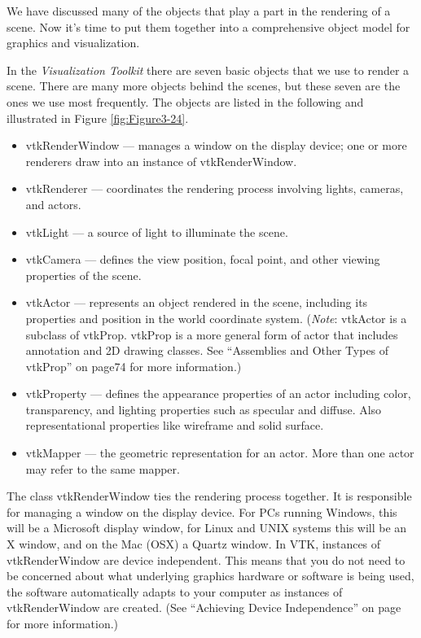 We have discussed many of the objects that play a part in the rendering of a scene. Now it's time to put them together into a comprehensive object model for graphics and visualization.

In the \emph{Visualization Toolkit} there are seven basic objects that we use to render a scene. There are many more objects behind the scenes, but these seven are the ones we use most frequently. The objects are listed in the following and illustrated in Figure \ref{fig:Figure3-24}.

\begin{itemize}
\item vtkRenderWindow --- manages a window on the display device; one or   more renderers draw into an instance of vtkRenderWindow.

\item vtkRenderer --- coordinates the rendering process involving lights,   cameras, and actors.

\item vtkLight --- a source of light to illuminate the scene. 

\item vtkCamera --- defines the view position, focal point, and other viewing properties of the scene.

\item vtkActor --- represents an object rendered in the scene, including its properties and position in the world coordinate system. (\emph{Note}: vtkActor is a subclass of vtkProp. vtkProp is a more general form of actor that includes annotation and 2D drawing classes. See ``Assemblies and Other Types of vtkProp'' on page74 for more
information.)

\item vtkProperty --- defines the appearance properties of an actor including color, transparency, and lighting properties such as specular and diffuse. Also representational properties like wireframe and solid surface.

\item vtkMapper --- the geometric representation for an actor. More than one actor may refer to the same mapper.
\end{itemize}

The class vtkRenderWindow ties the rendering process together. It is responsible for managing a window on the display device. For PCs running Windows, this will be a Microsoft display window, for Linux and UNIX systems this will be an X window, and on the Mac (OSX) a Quartz window. In VTK, instances of vtkRenderWindow are device independent. This means that you do not need to be concerned about what underlying graphics hardware or software is being used, the software automatically adapts to your computer as instances of vtkRenderWindow are created. (See ``Achieving Device Independence'' on page \pageref{sec:adi} for more information.)

